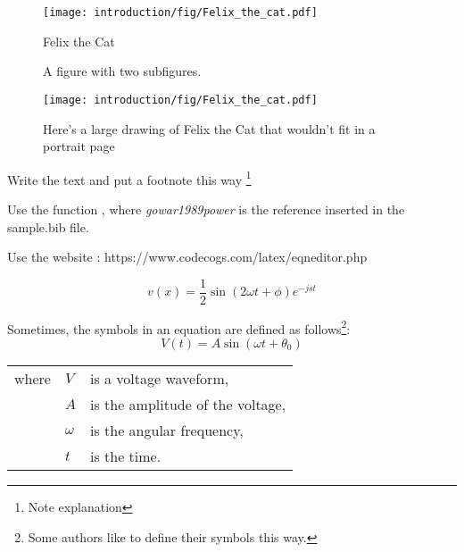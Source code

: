 

\begin{figure}[tb]
\centering
\texttt{[image: introduction/fig/Felix\_the\_cat.pdf]}
\caption{Felix the Cat}
\label{fig:felix}
\end{figure}



\begin{figure}[tb]
	\centering
	\caption{A figure with two subfigures.}
	\label{fig:fig2}
\end{figure}



\begin{landscape}
	\begin{figure}[htbp]
\centering
\texttt{[image: introduction/fig/Felix\_the\_cat.pdf]}
\caption{Here's a large drawing of Felix the Cat that wouldn't fit in a portrait page}
\label{fig:felix2}
\end{figure}
\end{landscape}



Write the text and put a footnote this way \footnote{Note explanation}


Use the function \cite{gowar1989power}, where \emph{gowar1989power} is the reference inserted in the sample.bib file.


Use the website : https://www.codecogs.com/latex/eqneditor.php

\begin{equation}
v(x)=\frac{1}{2}\sin(2 \omega t + \phi) e^{-j s t}
\label{eq:cacona}
\end{equation}

\begin{samepage}
Sometimes, the symbols in an equation are defined as follows\footnote{Some authors like to define their symbols this way.}:
\begin{equation}
	V(t)=A \sin(\omega t+\theta_0)
\end{equation}
\begin{tabular}{lll}
	where & $V$ & is a voltage waveform,\\
	& $A$ & is the amplitude of the voltage,\\
	& $\omega$ & is the angular frequency,\\
	& $t$ & is the time.
\end{tabular}
\end{samepage}

